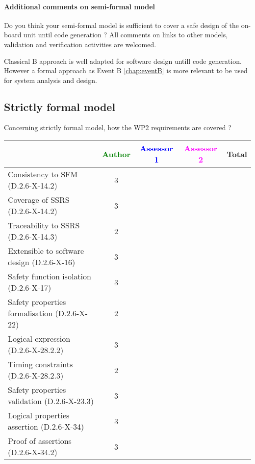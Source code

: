 \paragraph{Additional comments on semi-formal  model} Do you think your semi-formal  model is sufficient to cover a safe design of the on-board unit until code generation ?
All comments on links to  other models, validation and verification activities are welcomed.



\begin{author_comment}
Classical B  approach is well adapted for software design untill code generation. However a formal approach as Event B \ref{chap:eventB} is more relevant to be used for system analysis and design.
\end{author_comment}


\subsection{Strictly formal model}

Concerning strictly formal model, how the WP2 requirements are covered ?

\begin{tabular}{|l | c | c | c | c|}
\hline
& \textcolor{green}{Author} & \textcolor{blue}{Assessor 1} & \textcolor{magenta}{Assessor 2} & Total \\
\hline 
Consistency to SFM (D.2.6-X-14.2) & 3 & & &  \\
\hline
Coverage of SSRS (D.2.6-X-14.2)  & 3 & & &  \\
\hline
Traceability to  SSRS (D.2.6-X-14.3)  & 2 & & &  \\
\hline
Extensible to software design (D.2.6-X-16)  & 3 & & &  \\
\hline
Safety function isolation (D.2.6-X-17)  & 3 & & &  \\
\hline 
Safety properties formalisation (D.2.6-X-22)  & 2 & & &  \\
\hline
Logical expression (D.2.6-X-28.2.2)  & 3 & & &  \\
\hline
Timing constraints (D.2.6-X-28.2.3)  & 2 & & &  \\
\hline
Safety properties validation (D.2.6-X-23.3)  & 3 & & &  \\
\hline
Logical properties assertion (D.2.6-X-34)  & 3 & & &  \\
\hline
Proof of assertions (D.2.6-X-34.2)  & 3 & & &  \\
\hline
\end{tabular}




